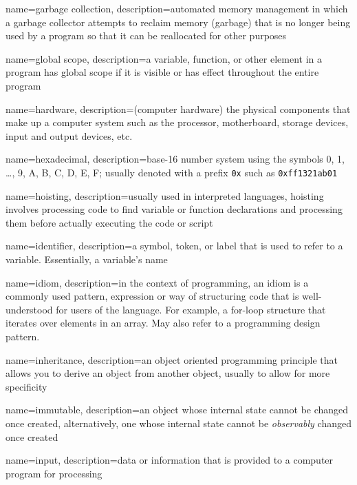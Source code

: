 {
  name=garbage collection,
  description={automated memory management in which a garbage collector attempts to reclaim memory (garbage) that is no
	longer being used by a program so that it can be reallocated for other purposes}
}

{
  name=global scope,
  description={a variable, function, or other element in a program has global scope if it is visible or has effect throughout
  	the entire program}
}

{
  name=hardware,
  description={(computer hardware) the physical components that make up a computer system such as the processor, motherboard, storage devices, input and output devices, etc.}
}

{
  name=hexadecimal,
  description={base-16 number system using the symbols 0, 1, \ldots, 9, A, B, C, D, E, F; usually denoted with a prefix \texttt{0x} such as
\texttt{0xff1321ab01}}
}


{
  name=hoisting,
  description={usually used in interpreted languages, hoisting involves processing code to find variable or function declarations and processing them before actually executing the code or script}
}

{
  name=identifier,
  description={a symbol, token, or label that is used to refer to a variable.  Essentially, a variable's name}
}

{
  name=idiom,
  description={in the context of programming, an idiom is a commonly used pattern, expression or way of structuring code that is well-understood for users of the language.  For example, a for-loop structure that iterates over elements in an array.  May also refer to a programming design pattern.}
}

{
  name=inheritance,
  description={an object oriented programming principle that allows you to derive an object from another object, usually to allow for more specificity}
}

{
  name=immutable,
  description={an object whose internal state cannot be changed once created, alternatively, one whose internal state
  cannot be \emph{observably} changed once created}
}

{
  name=input,
  description={data or information that is provided to a computer program for processing}
}

